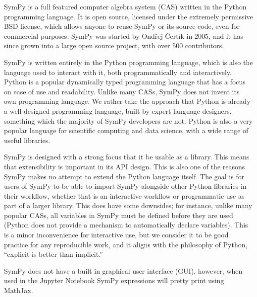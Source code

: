 SymPy is a full featured computer algebra system (CAS) written in the Python
programming language. It is open source, licensed under the extremely
permissive BSD license, which allows anyone to reuse SymPy or its source code,
even for commercial purposes. SymPy was started by Ond\v{r}ej \v{C}ert\'{\i}k
in 2005, and it has since grown into a large open source project, with over
500 contributors.

SymPy is written entirely in the Python programming language,
which is also the language used to interact with it, both programmatically and
interactively. Python is a popular dynamically typed programming language that
has a focus on ease of use and readability. Unlike many CASs, SymPy does not
invent its own programming language. We rather take the approach that Python
is already a well-designed programming language, built by expert language
designers, something which the majority of SymPy developers are not. Python is
also a very popular language for scientific computing and data science, with a
wide range of useful libraries.

SymPy is designed with a strong focus that it be usable as a library. This
means that extensibility is important in its API design. This is also one of
the reasons SymPy makes no attempt to extend the Python language itself. The
goal is for users of SymPy to be able to import SymPy alongside other Python
libraries in their workflow, whether that is an interactive workflow or
programmatic use as part of a larger library. This does have some downsides;
for instance, unlike many popular CASs, all variables in SymPy must be defined
before they are used (Python does not provide a mechanism to automatically
declare variables). This is a minor inconvenience for interactive use, but we
consider it to be good practice for any reproducible work, and it aligns with
the philosophy of Python, ``explicit is better than implicit.''

SymPy does not have a built in graphical user interface (GUI), however, when
used in the Jupyter Notebook
SymPy expressions will pretty print using MathJax.
